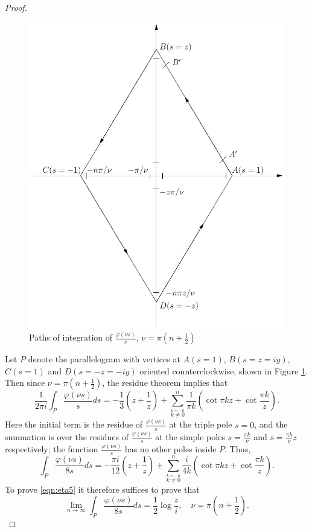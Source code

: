 \documentclass{article}
\begin{document}
\begin{proof}
\begin{figure}
\caption{Paths of integration of $\frac{\varphi(\nu s)}{s}$, $\nu=\pi(n+\frac{1}{2})$}
\begin{center}
\includegraphics[scale=0.75]{eta1.pdf}
\end{center}
\label{figure:etaP}
\end{figure}

Let $P$ denote the parallelogram with vertices at $A (s=1)$, $B(s=z=iy)$, $C(s=1)$ and $D(s=-z=-iy)$ oriented counterclockwise, 
shown in Figure \ref{figure:etaP}. Then since $\nu=\pi(n+\frac{1}{2})$, the residue theorem implies that
\[
\frac{1}{2\pi i}\int_P \frac{\varphi(\nu s)}{s} ds=-\frac{1}{3}(z+\frac{1}{z})+\sum_{\stackrel{k=-n}{k \neq 0}}^n \frac{1}{\pi k}(\cot \pi kz+\cot \frac{\pi k}{z}).
\]
Here the initial term is the residue of $\frac{\varphi(\nu s)}{s}$ at the triple pole $s=0$, and the summation is over the residues of $\frac{\varphi(\nu s)}{s}$ at the simple poles $s=\frac{\pi k}{\nu}$ and $s=\frac{\pi k}{\nu}z$ respectively; the function $\frac{\varphi(\nu s)}{s}$ has no other poles inside $P$.
Thus,
\[
\int_P \frac{\varphi(\nu s)}{8s} ds=-\frac{\pi i}{12}(z+\frac{1}{z}) +\sum_{\stackrel{k=-n}{k \neq 0}}^n \frac{i}{4 k}(\cot \pi kz+\cot \frac{\pi k}{z}).
\]
To prove \eqref{eqn:eta5} it therefore suffices to prove that
\begin{equation}
\label{eqn:etaintegral1}
\lim_{n \to \infty} \int_P \frac{\varphi(\nu s)}{8s}ds=\frac{1}{2}\log \frac{z}{i}, \quad \nu=\pi(n+\frac{1}{2}).
\end{equation}



\end{proof}
\end{document}
